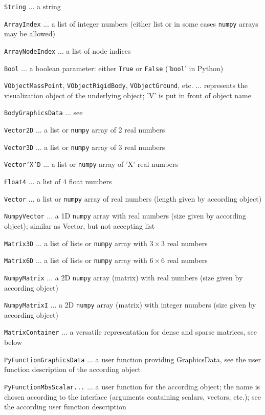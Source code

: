   \item \texttt{String} $\ldots$ a string
  \item \texttt{ArrayIndex} $\ldots$ a list of integer numbers (either list or in some cases \texttt{numpy} arrays may be allowed)
  \item \texttt{ArrayNodeIndex} $\ldots$ a list of node indices
  \item \texttt{Bool} $\ldots$ a boolean parameter: either \texttt{True} or \texttt{False} ('\texttt{bool}' in Python)
  \item \texttt{VObjectMassPoint}, \texttt{VObjectRigidBody}, \texttt{VObjectGround}, etc.  $\ldots$ represents the visualization object of the underlying object; 'V' is put in front of object name
  \item \texttt{BodyGraphicsData} $\ldots$ see 
%	
	\item \texttt{Vector2D} $\ldots$ a list or \texttt{numpy} array of 2 real numbers
	\item \texttt{Vector3D} $\ldots$ a list or \texttt{numpy} array of 3 real numbers
	\item \texttt{Vector'X'D} $\ldots$ a list or \texttt{numpy} array of 'X' real numbers
	\item \texttt{Float4} $\ldots$ a list of 4 float numbers
%
	\item \texttt{Vector} $\ldots$ a list or \texttt{numpy} array of real numbers (length given by according object)
	\item \texttt{NumpyVector} $\ldots$ a 1D \texttt{numpy} array with real numbers (size given by according object); similar as Vector, but not accepting list

	\item \texttt{Matrix3D} $\ldots$ a list of lists or \texttt{numpy} array with $3 \times 3$ real numbers
	\item \texttt{Matrix6D} $\ldots$ a list of lists or \texttt{numpy} array with $6 \times 6$ real numbers
	\item \texttt{NumpyMatrix} $\ldots$ a 2D \texttt{numpy} array (matrix) with real numbers (size given by according object)
	\item \texttt{NumpyMatrixI} $\ldots$ a 2D \texttt{numpy} array (matrix) with integer numbers (size given by according object)
	\item \texttt{MatrixContainer} $\ldots$ a versatile representation for dense and sparse matrices, see  below
  \item \texttt{PyFunctionGraphicsData} $\ldots$ a user function providing GraphicsData, see the user function description of the according object
  \item \texttt{PyFunctionMbsScalar...} $\ldots$ a user function for the according object; the name is chosen according to the interface (arguments containing scalars, vectors, etc.); see the according user function description
\ei


